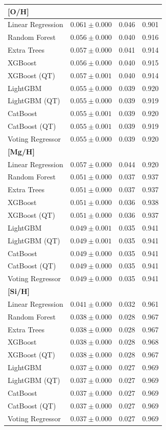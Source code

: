 \documentclass{aa}
\begin{document}
\begin{appendix}
\begin{table}
\begin{tabular}{lccc}
\multicolumn{4}{l}{\textbf{[O/H]}} \\
\hline
Linear Regression & $0.061 \pm 0.000$ & 0.046 & 0.901 \\
Random Forest & $0.056 \pm 0.000$ & 0.040 & 0.916 \\
Extra Trees & $0.057 \pm 0.000$ & 0.041 & 0.914 \\
XGBoost & $0.056 \pm 0.000$ & 0.040 & 0.915 \\
XGBoost (QT) & $0.057 \pm 0.001$ & 0.040 & 0.914 \\
LightGBM & $\mathbf{0.055 \pm 0.000}$ & 0.039 & 0.920 \\
LightGBM (QT) & $0.055 \pm 0.000$ & 0.039 & 0.919 \\
CatBoost & $0.055 \pm 0.001$ & 0.039 & 0.920 \\
CatBoost (QT) & $0.055 \pm 0.001$ & 0.039 & 0.919 \\
Voting Regressor & $0.055 \pm 0.000$ & 0.039 & 0.920 \\
\hline


\multicolumn{4}{l}{\textbf{[Mg/H]}} \\
\hline
Linear Regression & $0.057 \pm 0.000$ & 0.044 & 0.920 \\
Random Forest & $0.051 \pm 0.000$ & 0.037 & 0.937 \\
Extra Trees & $0.051 \pm 0.000$ & 0.037 & 0.937 \\
XGBoost & $0.051 \pm 0.000$ & 0.036 & 0.938 \\
XGBoost (QT) & $0.051 \pm 0.000$ & 0.036 & 0.937 \\
LightGBM & $\mathbf{0.049 \pm 0.001}$ & 0.035 & 0.941 \\
LightGBM (QT) & $0.049 \pm 0.001$ & 0.035 & 0.941 \\
CatBoost & $0.049 \pm 0.000$ & 0.035 & 0.941 \\
CatBoost (QT) & $0.049 \pm 0.000$ & 0.035 & 0.941 \\
Voting Regressor & $0.049 \pm 0.000$ & 0.035 & 0.941 \\
\hline

\multicolumn{4}{l}{\textbf{[Si/H]}} \\
\hline
Linear Regression & $0.041 \pm 0.000$ & 0.032 & 0.961 \\
Random Forest & $0.038 \pm 0.000$ & 0.028 & 0.967 \\
Extra Trees & $0.038 \pm 0.000$ & 0.028 & 0.967 \\
XGBoost & $0.038 \pm 0.000$ & 0.028 & 0.968 \\
XGBoost (QT) & $0.038 \pm 0.000$ & 0.028 & 0.967 \\
LightGBM & $\mathbf{0.037 \pm 0.000}$ & 0.027 & 0.969 \\
LightGBM (QT) & $0.037 \pm 0.000$ & 0.027 & 0.969 \\
CatBoost & $0.037 \pm 0.000$ & 0.027 & 0.969 \\
CatBoost (QT) & $0.037 \pm 0.000$ & 0.027 & 0.969 \\
Voting Regressor & $0.037 \pm 0.000$ & 0.027 & 0.969 \\
\hline


\end{tabular}
\end{table}
\end{appendix}
\end{document}
